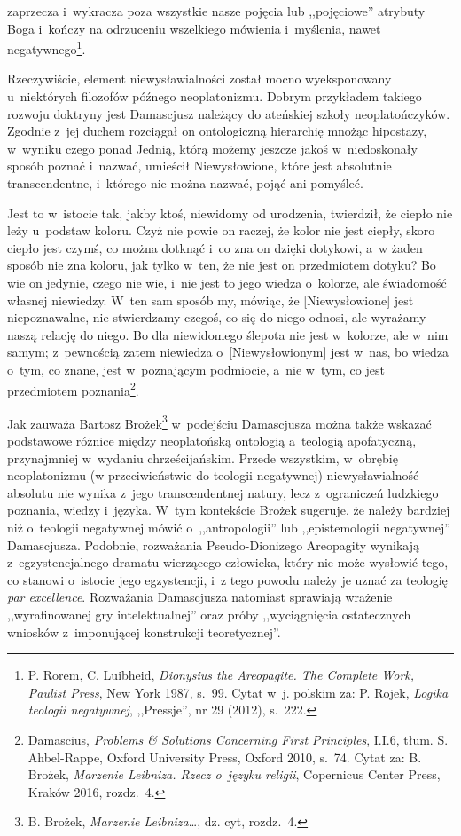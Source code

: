 zaprzecza i~wykracza poza wszystkie nasze pojęcia lub ,,pojęciowe'' atrybuty Boga i~kończy na odrzuceniu wszelkiego mówienia i~myślenia, nawet negatywnego\footnote{P. Rorem, C. Luibheid, \textit{Dionysius the Areopagite. The Complete Work, Paulist Press}, New York 1987, s.~99. Cytat w~j. polskim za: P. Rojek, \textit{Logika teologii negatywnej}, ,,Pressje'', nr 29 (2012), s.~222.}.

Rzeczywiście, element niewysławialności został mocno wyeksponowany u~niektórych filozofów późnego neoplatonizmu. Dobrym przykładem takiego rozwoju doktryny jest Damascjusz należący do ateńskiej szkoły neoplatończyków. Zgodnie z~jej duchem rozciągał on ontologiczną hierarchię mnożąc hipostazy, w~wyniku czego ponad Jednią, którą możemy jeszcze jakoś w~niedoskonały sposób poznać i~nazwać, umieścił Niewysłowione, które jest absolutnie transcendentne, i~którego nie można nazwać, pojąć ani pomyśleć.

Jest to w~istocie tak, jakby ktoś, niewidomy od urodzenia, twierdził, że ciepło nie leży u~podstaw koloru. Czyż nie powie on raczej, że kolor nie jest ciepły, skoro ciepło jest czymś, co można dotknąć i~co zna on dzięki dotykowi, a~w żaden sposób nie zna koloru, jak tylko w~ten, że nie jest on przedmiotem dotyku? Bo wie on jedynie, czego nie wie, i~nie jest to jego wiedza o~kolorze, ale świadomość własnej niewiedzy. W~ten sam sposób my, mówiąc, że [Niewysłowione] jest niepoznawalne, nie stwierdzamy czegoś, co się do niego odnosi, ale wyrażamy naszą relację do niego. Bo dla niewidomego ślepota nie jest w~kolorze, ale w~nim samym; z~pewnością zatem niewiedza o~[Niewysłowionym] jest w~nas, bo wiedza o~tym, co znane, jest w~poznającym podmiocie, a~nie w~tym, co jest przedmiotem poznania\footnote{Damascius, \textit{Problems \& Solutions Concerning First Principles}, I.I.6, tłum. S. Ahbel-Rappe, Oxford University Press, Oxford 2010, s.~74. Cytat za: B. Brożek, \textit{Marzenie Leibniza. Rzecz o~języku religii}, Copernicus Center Press, Kraków 2016, rozdz.~4.}.

Jak zauważa Bartosz Brożek\footnote{B. Brożek, \textit{Marzenie Leibniza}…, dz. cyt, rozdz.~4.} w~podejściu Damascjusza można także wskazać podstawowe różnice między neoplatońską ontologią a~teologią apofatyczną, przynajmniej w~wydaniu chrześcijańskim. Przede wszystkim, w~obrębię neoplatonizmu (w przeciwieństwie do teologii negatywnej) niewysławialność absolutu nie wynika z~jego transcendentnej natury, lecz z~ograniczeń ludzkiego poznania, wiedzy i~języka. W~tym kontekście Brożek sugeruje, że należy bardziej niż o~teologii negatywnej mówić o~,,antropologii'' lub ,,epistemologii negatywnej'' Damascjusza. Podobnie, rozważania Pseudo-Dionizego Areopagity wynikają z~egzystencjalnego dramatu wierzącego człowieka, który nie może wysłowić tego, co stanowi o~istocie jego egzystencji, i~z tego powodu należy je uznać za teologię \textit{par excellence}. Rozważania Damascjusza natomiast sprawiają wrażenie ,,wyrafinowanej gry intelektualnej'' oraz próby ,,wyciągnięcia ostatecznych wniosków z~imponującej konstrukcji teoretycznej''.

